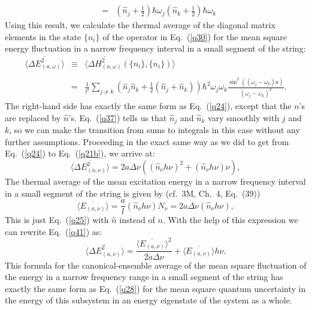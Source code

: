 \documentclass{elsart}
\begin{document}
{\begin{eqnarray}
 & & \label{q38} \\
  & = & \left( \hat{n}_j + \frac{1}{2} \right) \hbar \omega_j
\left( \hat{n}_k + \frac{1}{2} \right) \hbar \omega_k \nonumber
\end{eqnarray}
Using this result, we calculate the thermal average of the diagonal matrix elements in the state $\{ n_i \}$ of the operator in Eq.\ (\ref{q30}) for the mean square energy fluctuation in a narrow frequency interval in a small segment of the string:
\begin{eqnarray}
\langle \overline{\Delta E_{(a, \omega)}^2} \rangle  & \equiv & \langle \overline{\Delta H_{(a, \omega)}^2} (\{ n_i \}, \{ n_i \}) \rangle \nonumber \\
& & \label{q39} \\ 
 & = & \frac{1}{l^2}  \sum_{j \neq k} \left(  \hat{n}_{j}\hat{n}_{k}+\frac{1}{2} \left( \hat{n}_{j}+\hat{n}_{k} \right)
 \right) \hbar^{2}\omega_{j}\omega_{k}  \frac{\sin^2{((\omega_j - \omega_k)a)}}{(\omega_j - \omega_k)^2}.  \nonumber
\end{eqnarray}
The right-hand side has exactly the same form as Eq.\ (\ref{q24}), except that the $n$'s are replaced by $\hat{n}$'s. Eq.\ (\ref{q37}) tells us that $\hat{n}_j$ and $\hat{n}_k$ vary smoothly with $j$ and $k$, so we can make the transition from sums to integrals in this case without any further assumptions. Proceeding in the exact same way as we did to get from Eq.\ (\ref{q24}) to Eq.\ (\ref{q21b}), we arrive at:
 \begin{equation}
\langle \overline{\Delta E_{(a, \nu)}^2} \rangle = 2 a \Delta \nu  \left( (\hat{n}_\nu h \nu)^2 + ( \hat{n}_\nu h \nu) \nu \right),
\label{q41}
\end{equation}
The thermal average of the mean excitation energy in a narrow frequency interval in a small segment of the string is given by (cf.\ 3M, Ch.\ 4, Eq.\ (39))
\begin{equation}
\langle \overline{E_{(a, \nu)} } \rangle = \frac{a}{l} \left( \hat{n}_\nu h \nu \right) N_\nu = 2 a \Delta \nu \left( \hat{n}_\nu h \nu \right),
\label{q42}
\end{equation}
This is just Eq.\ (\ref{q25}) with $\hat{n}$ instead of $n$.  With the help of this expression we can rewrite Eq.\ (\ref{q41}) as:
\begin{equation}
\langle \overline{\Delta E_{(a, \nu)}^2} \rangle =
\frac{ \langle \overline{ E_{(a, \nu)}} \rangle^2}{2a\Delta \nu} +\langle  \overline{E_{(a, \nu)}} \rangle h \nu.
\label{q43}
\end{equation}
This formula for the canonical-ensemble average of
the mean square fluctuation of the energy in a narrow frequency range in a small segment of the string has exactly the same form as Eq.\ (\ref{q28}) for the mean square quantum uncertainty in the energy of this subsystem in an energy eigenstate of the system as a whole. 

}
\end{document}
